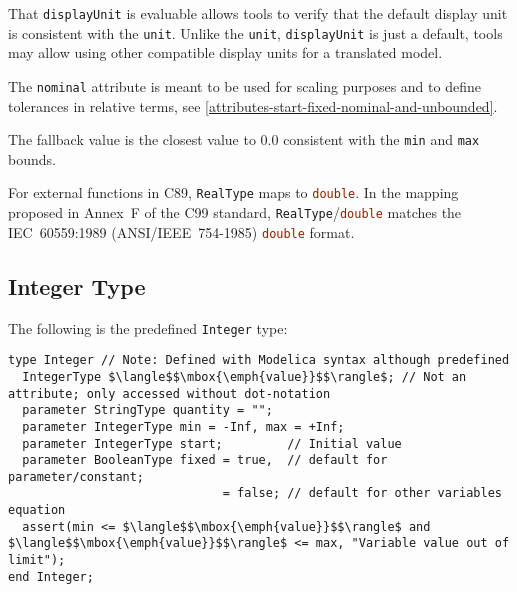 \begin{nonnormative}
That \lstinline!displayUnit! is evaluable allows tools to verify that the default display unit is consistent with the \lstinline!unit!.
Unlike the \lstinline!unit!, \lstinline!displayUnit! is just a default, tools may allow using other compatible display units for a translated model.
\end{nonnormative}

The \lstinline!nominal! attribute is meant to be used for scaling purposes and to
define tolerances in relative terms, see \cref{attributes-start-fixed-nominal-and-unbounded}.

The fallback value is the closest value to $0.0$ consistent with the \lstinline!min! and \lstinline!max! bounds.

\begin{nonnormative}
For external functions in C89, \lstinline!RealType! maps to \lstinline[language=C]!double!.  In the mapping proposed in Annex~F of the C99 standard,
\lstinline!RealType!/\lstinline[language=C]!double! matches the IEC~60559:1989 (ANSI/IEEE~754-1985) \lstinline[language=C]!double! format.
\end{nonnormative}

\subsection{Integer Type}\label{integer-type}

The following is the predefined \lstinline!Integer! type:
\begin{lstlisting}[language=modelica]
type Integer // Note: Defined with Modelica syntax although predefined
  IntegerType $\langle$$\mbox{\emph{value}}$$\rangle$; // Not an attribute; only accessed without dot-notation
  parameter StringType quantity = "";
  parameter IntegerType min = -Inf, max = +Inf;
  parameter IntegerType start;         // Initial value
  parameter BooleanType fixed = true,  // default for parameter/constant;
                              = false; // default for other variables
equation
  assert(min <= $\langle$$\mbox{\emph{value}}$$\rangle$ and $\langle$$\mbox{\emph{value}}$$\rangle$ <= max, "Variable value out of limit");
end Integer;
\end{lstlisting}%
%
%
%
%

